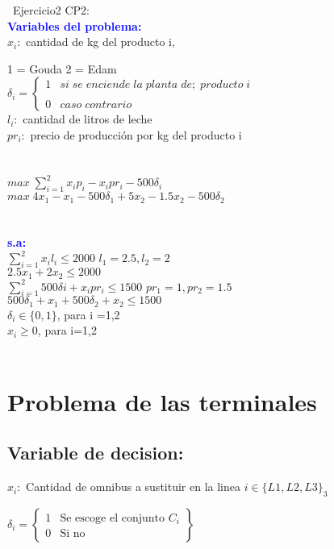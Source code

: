 \documentclass[]{article}
\begin{document}
\noindent\ Ejercicio2 CP2:\\
\noindent \textcolor{blue}{\textbf{Variables del problema:}}\\
\noindent
$x_{i}:$ cantidad de  kg del producto i, {1 = Gouda 2 = Edam\\ 
\noindent
$   
    \textbf{$\delta_{i}$}=
    \left\lbrace\begin{array}{cc}
        1 & si\; se\; enciende\; la\; planta\; de;\; producto\; i\\\\
        0 & caso\; contrario
    \end{array}\right.
$
\\
$l_{i}:$ cantidad de litros de leche\\
$pr_{i}:$ precio de producci\'on por kg del producto i\\
\\\\
$max\;  \sum_{i=1}^{2}x_{i}p_{i} - x_{i}pr_{i} - 500\delta_{i}$\\
$max\;  4x_{1} - x_{1} - 500\delta_{1} + 5x_{2} - 1.5x_{2} - 500\delta_{2}$\\
\\\\
\noindent \textcolor{blue}{\textbf{s.a:}}\\
$\sum_{i=1}^{2}x_{i}l_{i} \le 2000$ $l_{1}=2.5,l_{2}=2$\\
\noindent$2.5x_{1} + 2x_{2}\le 2000$\\
$\sum_{i=1}^{2}500\delta{i} + x_{i}pr_{i} \le 1500$ $pr_{1}=1,pr_{2}=1.5$\\
\noindent$500\delta_{1} + x_{1} + 500\delta_{2} + x_{2}\le 1500$\\
$\delta_{i}\in \{0,1\}$, para i =1,2\\
$x_{i}\ge 0$, para i=1,2
\\\\
\section{Problema de las terminales }

\subsection{Variable de decision:}

$x_i:$ Cantidad de omnibus a sustituir en la  linea $i \in \{L1,L2,L3\}_3$ 

$
\delta_{i} = 
 \left\{ \begin{array}{cl}
 1 & \mbox{Se escoge el conjunto $C_i$}\\
 0 & \mbox{Si no}
 \end{array}\right\}
$


}
\end{document}
